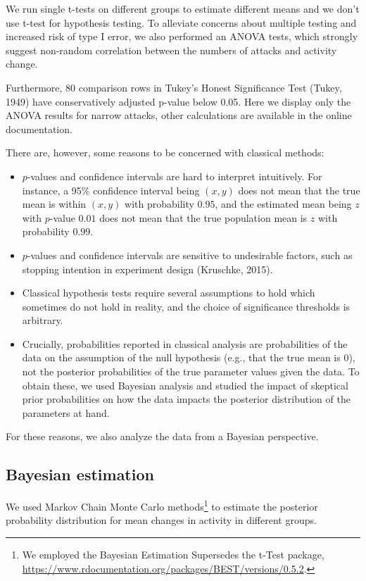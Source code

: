 \documentclass[
  10pt,
  dvipsnames]{scrartcl}
\begin{document}
We run single t-tests on different groups to estimate different means
and we don't use t-test for hypothesis testing. To alleviate concerns
about multiple testing and increased risk of type I error, we also
performed an ANOVA tests, which strongly suggest non-random correlation
between the numbers of attacks and activity change.

Furthermore, 80 comparison rows in Tukey's Honest Significance Test
(Tukey, 1949) have conservatively adjusted p-value below 0.05. Here we
display only the ANOVA results for narrow attacks, other calculations
are available in the online documentation.

There are, however, some reasons to be concerned with classical methods:

\begin{itemize}
\item
  \(p\)-values and confidence intervals are hard to interpret
  intuitively. For instance, a 95\% confidence interval being \((x,y)\)
  does not mean that the true mean is within \((x,y)\) with probability
  \(0.95\), and the estimated mean being \(z\) with \(p\)-value \(0.01\)
  does not mean that the true population mean is \(z\) with probability
  \(0.99\).
\item
  \(p\)-values and confidence intervals are sensitive to undesirable
  factors, such as stopping intention in experiment design (Kruschke,
  2015).
\item
  Classical hypothesis tests require several assumptions to hold which
  sometimes do not hold in reality, and the choice of significance
  thresholds is arbitrary.
\item
  Crucially, probabilities reported in classical analysis are
  probabilities of the data on the assumption of the null hypothesis
  (e.g., that the true mean is 0), not the posterior probabilities of
  the true parameter values given the data. To obtain these, we used
  Bayesian analysis and studied the impact of skeptical prior
  probabilities on how the data impacts the posterior distribution of
  the parameters at hand.
\end{itemize}

For these reasons, we also analyze the data from a Bayesian perspective.

\subsection{Bayesian estimation}

We used Markov Chain Monte Carlo methods\footnote{We employed the
  \textsf{Bayesian Estimation Supersedes the t-Test} package,
  \url{https://www.rdocumentation.org/packages/BEST/versions/0.5.2}.} to
estimate the posterior probability distribution for mean changes in
activity in different groups.
\end{document}
